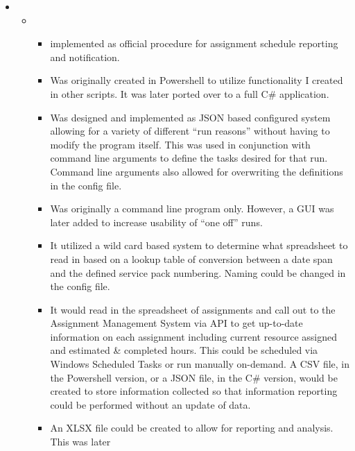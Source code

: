 \documentclass[margin]{res}
\begin{document}
\begin{resume}
\begin{itemize}
    \item[]
         \begin{itemize}
             \item[]
               \begin{itemize}
                  \item[] implemented as official procedure for assignment schedule reporting and notification.
                  \item Was originally created in Powershell to utilize functionality I created in 
                     other scripts. It was later ported over to a full C\# application.
                  \item Was designed and implemented as JSON based configured system allowing for a 
                      variety of different ``run reasons'' without having to modify the program itself.
                      This was used in conjunction with command line arguments to define the tasks
                      desired for that run. Command line arguments also allowed for overwriting the
                      definitions in the config file.
                  \item Was originally a command line program only. However, a GUI was later added to
                     increase usability of ``one off'' runs.
                  \item It utilized a wild card based system to determine what spreadsheet to read in
                     based on a lookup table of conversion between a date span and the defined service
                     pack numbering. Naming could be changed in the config file.
                  \item It would read in the spreadsheet of assignments and call out to the Assignment
                     Management System via API to get up-to-date \\
                     information on each assignment including
                     current resource assigned and estimated \& completed hours. This could be scheduled
                     via \\
                     Windows Scheduled Tasks or run manually on-demand. A CSV file, in the Powershell 
                     version, or a JSON file, in the C\# version, would be created to store information 
                     collected so that information reporting could be performed without an update of data.
                  \item An XLSX file could be created to allow for reporting and analysis. This was later

\end{itemize}
\end{itemize}
\end{itemize}
\end{resume}
\end{document}
